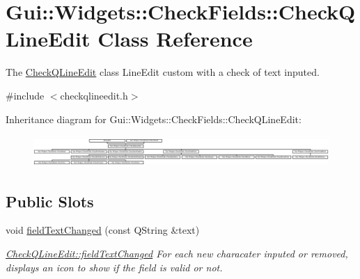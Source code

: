 \hypertarget{classGui_1_1Widgets_1_1CheckFields_1_1CheckQLineEdit}{}\section{Gui\+:\+:Widgets\+:\+:Check\+Fields\+:\+:Check\+Q\+Line\+Edit Class Reference}
\label{classGui_1_1Widgets_1_1CheckFields_1_1CheckQLineEdit}


The \hyperlink{classGui_1_1Widgets_1_1CheckFields_1_1CheckQLineEdit}{Check\+Q\+Line\+Edit} class Line\+Edit custom with a check of text inputed.  




{\ttfamily \#include $<$checkqlineedit.\+h$>$}

Inheritance diagram for Gui\+:\+:Widgets\+:\+:Check\+Fields\+:\+:Check\+Q\+Line\+Edit\+:\begin{figure}[H]
\begin{center}
\leavevmode
\includegraphics[height=1.202749cm]{d0/d68/classGui_1_1Widgets_1_1CheckFields_1_1CheckQLineEdit}
\end{center}
\end{figure}
\subsection*{Public Slots}
\begin{DoxyCompactItemize}
\item 
\hypertarget{classGui_1_1Widgets_1_1CheckFields_1_1CheckQLineEdit_ad297d518964bd170e8cc7533795ff99e}{}void \hyperlink{classGui_1_1Widgets_1_1CheckFields_1_1CheckQLineEdit_ad297d518964bd170e8cc7533795ff99e}{field\+Text\+Changed} (const Q\+String \&text)\label{classGui_1_1Widgets_1_1CheckFields_1_1CheckQLineEdit_ad297d518964bd170e8cc7533795ff99e}

\begin{DoxyCompactList}\small\item\em \hyperlink{classGui_1_1Widgets_1_1CheckFields_1_1CheckQLineEdit_ad297d518964bd170e8cc7533795ff99e}{Check\+Q\+Line\+Edit\+::field\+Text\+Changed} For each new characater inputed or removed, displays an icon to show if the field is valid or not. \end{DoxyCompactList}\end{DoxyCompactItemize}
